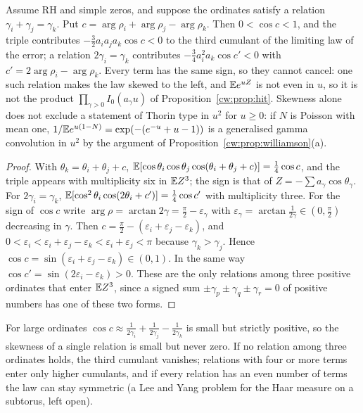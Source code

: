 \begin{proposition}\label{cw:prop:relation}
Assume RH and simple zeros, and suppose the ordinates satisfy a relation $\gamma_i+\gamma_j=\gamma_k$. Put $c=\arg\rho_i+\arg\rho_j-\arg\rho_k$. Then $0<\cos c<1$, and the triple contributes $-\frac32a_ia_ja_k\cos c<0$ to the third cumulant of the limiting law of the error; a relation $2\gamma_i=\gamma_k$ contributes $-\frac34a_i^2a_k\cos c'<0$ with $c'=2\arg\rho_i-\arg\rho_k$. Every term has the same sign, so they cannot cancel: one such relation makes the law skewed to the left, and $\mathbb{E} e^{uZ}$ is not even in $u$, so it is not the product $\prod_{\gamma>0}I_0(a_\gamma u)$ of Proposition~\ref{cw:prop:hit}. Skewness alone does not exclude a statement of Thorin type in $u^2$ for $u\ge0$: if $N$ is Poisson with mean one, $1/\mathbb{E} e^{u(1-N)}=\exp(-(e^{-u}+u-1))$ is a generalised gamma convolution in $u^2$ by the argument of Proposition~\ref{cw:prop:williamson}(a).
\end{proposition}

\begin{proof}
With $\theta_k=\theta_i+\theta_j+c$, $\mathbb{E}[\cos\theta_i\cos\theta_j\cos(\theta_i+\theta_j+c)]=\frac14\cos c$, and the triple appears with multiplicity six in $\mathbb{E} Z^3$; the sign is that of $Z=-\sum a_\gamma\cos\theta_\gamma$. For $2\gamma_i=\gamma_k$, $\mathbb{E}[\cos^2\theta_i\cos(2\theta_i+c')]=\frac14\cos c'$ with multiplicity three. For the sign of $\cos c$ write $\arg\rho=\arctan2\gamma=\frac\pi2-\varepsilon_\gamma$ with $\varepsilon_\gamma=\arctan\frac1{2\gamma}\in(0,\frac\pi2)$ decreasing in $\gamma$. Then $c=\frac\pi2-(\varepsilon_i+\varepsilon_j-\varepsilon_k)$, and $0<\varepsilon_i<\varepsilon_i+\varepsilon_j-\varepsilon_k<\varepsilon_i+\varepsilon_j<\pi$ because $\gamma_k>\gamma_j$. Hence $\cos c=\sin(\varepsilon_i+\varepsilon_j-\varepsilon_k)\in(0,1)$. In the same way $\cos c'=\sin(2\varepsilon_i-\varepsilon_k)>0$. These are the only relations among three positive ordinates that enter $\mathbb{E} Z^3$, since a signed sum $\pm\gamma_p\pm\gamma_q\pm\gamma_r=0$ of positive numbers has one of these two forms.
\end{proof}

For large ordinates $\cos c\approx\frac1{2\gamma_i}+\frac1{2\gamma_j}-\frac1{2\gamma_k}$ is small but strictly positive, so the skewness of a single relation is small but never zero. If no relation among three ordinates holds, the third cumulant vanishes; relations with four or more terms enter only higher cumulants, and if every relation has an even number of terms the law can stay symmetric (a Lee and Yang problem for the Haar measure on a subtorus, left open).

